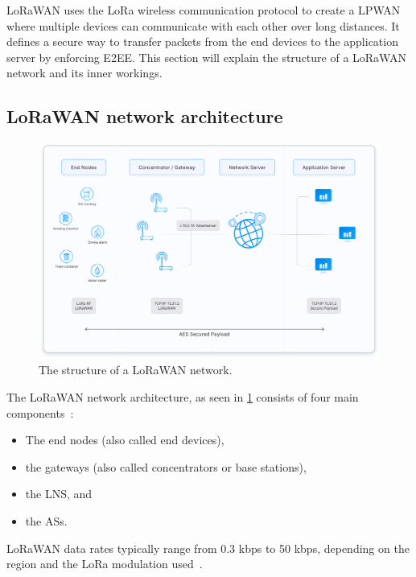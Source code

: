 \ac{LoRaWAN} uses the \ac{LoRa} wireless communication protocol to create a \ac{LPWAN} where multiple devices can communicate with each other over long distances.
It defines a secure way to transfer packets from the end devices to the application server by enforcing \ac{E2EE}.
This section will explain the structure of a \ac{LoRaWAN} network and its inner workings.

\subsection{\acs{LoRaWAN} network architecture}

\begin{figure}[htbp]
    \centering
    \includegraphics[width=1\textwidth]{pictures/lorawan-structure/lorawan-architecture.png}
    \caption{
        The structure of a \ac{LoRaWAN} network.~\protect\cite{the_things_industries_bv_lorawan_nodate}
    }\label{pic:lorawan-network-structure}
\end{figure}

The \ac{LoRaWAN} network architecture, as seen in \cref{pic:lorawan-network-structure} consists of four main components~\cite[p. 8]{lora_alliance_inc_lorawan_2017}:

\begin{itemize}
    \item The end nodes (also called end devices),
    \item the gateways (also called concentrators or base stations),
    \item the \acf{LNS}, and
    \item the \acfp{AS}.
\end{itemize}

\ac{LoRaWAN} data rates typically range from 0.3 kbps to 50 kbps, depending on the region and the \ac{LoRa} modulation used~\cite[p. 8]{lora_alliance_inc_lorawan_2017}.


